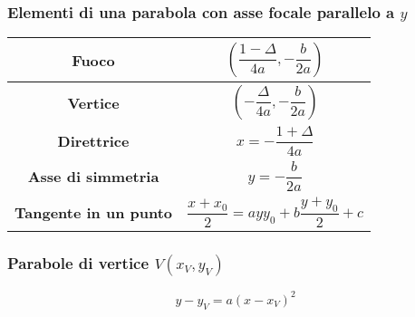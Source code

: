 \subsubsection{Elementi di una parabola con asse focale parallelo a $y$}
\begin{center}
  \begin{tabular}{c | c}
    \textbf{Fuoco} & $\left(\dfrac{1-\Delta}{4a},-\dfrac{b}{2a}\right)$\\\hline
    \textbf{Vertice} & $\left(-\dfrac{\Delta}{4a},-\dfrac{b}{2a}\right)$\\\hline
    \textbf{Direttrice} & $x=-\dfrac{1+\Delta}{4a}$\\\hline
    \textbf{Asse di simmetria} & $y=-\dfrac{b}{2a}$\\\hline
    \textbf{Tangente in un punto} & $\dfrac{x+x_0}{2}=ayy_0+b\dfrac{y+y	_0}{2}+c$
  \end{tabular}
\end{center}

\subsubsection{Parabole di vertice $V(x_V,y_V)$}
\begin{equation*}
  y-y_V=a(x-x_V)^2
\end{equation*}

